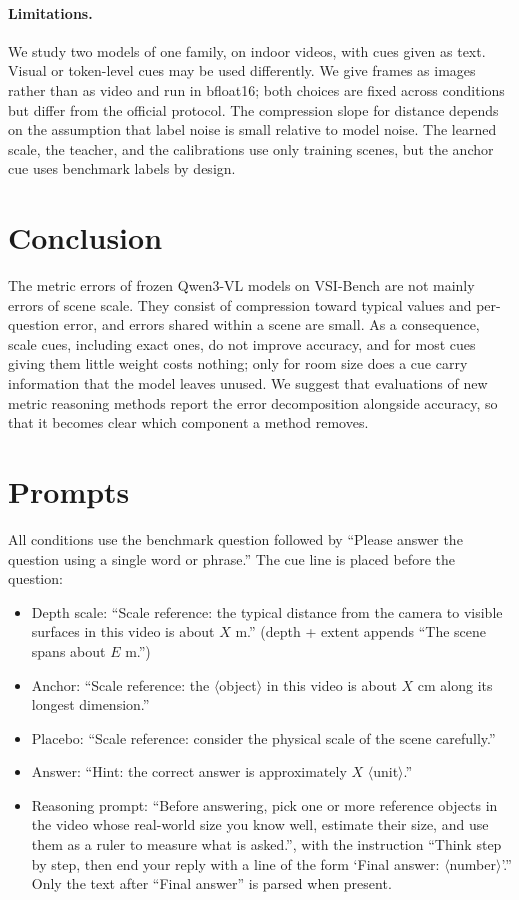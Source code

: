 \documentclass[letterpaper]{article} %
\begin{document}
\paragraph{Limitations.}
We study two models of one family, on indoor videos, with cues given as text. Visual or token-level cues may be used differently. We give frames as images rather than as video and run in bfloat16; both choices are fixed across conditions but differ from the official protocol. The compression slope for distance depends on the assumption that label noise is small relative to model noise. The learned scale, the teacher, and the calibrations use only training scenes, but the anchor cue uses benchmark labels by design.

\section{Conclusion}
The metric errors of frozen Qwen3-VL models on VSI-Bench are not mainly errors of scene scale. They consist of compression toward typical values and per-question error, and errors shared within a scene are small. As a consequence, scale cues, including exact ones, do not improve accuracy, and for most cues giving them little weight costs nothing; only for room size does a cue carry information that the model leaves unused. We suggest that evaluations of new metric reasoning methods report the error decomposition alongside accuracy, so that it becomes clear which component a method removes.



\appendix

\section{Prompts}
All conditions use the benchmark question followed by ``Please answer the question using a single word or phrase.'' The cue line is placed before the question:
\begin{itemize}
\item Depth scale: ``Scale reference: the typical distance from the camera to visible surfaces in this video is about $X$ m.'' (depth + extent appends ``The scene spans about $E$ m.'')
\item Anchor: ``Scale reference: the $\langle$object$\rangle$ in this video is about $X$ cm along its longest dimension.''
\item Placebo: ``Scale reference: consider the physical scale of the scene carefully.''
\item Answer: ``Hint: the correct answer is approximately $X$ $\langle$unit$\rangle$.''
\item Reasoning prompt: ``Before answering, pick one or more reference objects in the video whose real-world size you know well, estimate their size, and use them as a ruler to measure what is asked.'', with the instruction ``Think step by step, then end your reply with a line of the form `Final answer: $\langle$number$\rangle$'.'' Only the text after ``Final answer'' is parsed when present.
\end{itemize}
\end{document}
